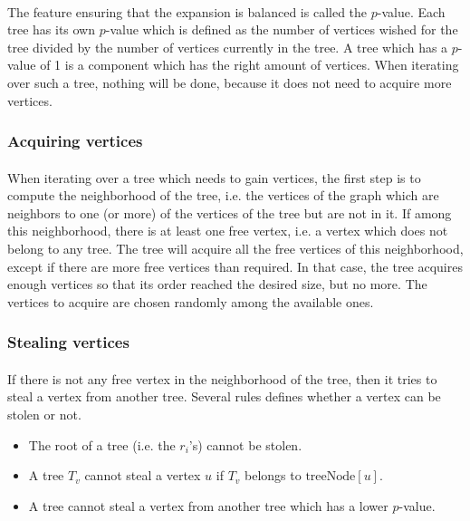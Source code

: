 \paragraph{}
The feature ensuring that the expansion is balanced is called the $p$-value.
Each tree has its own $p$-value which is defined as the number of vertices
wished for the tree divided by the number of vertices currently in the tree. A
tree which has a $p$-value of 1 is a component which has the right amount
of vertices. When iterating over such a tree, nothing will be done,
because it does not need to acquire more vertices.

\subsubsection{Acquiring vertices}
\paragraph{}
When iterating over a tree which needs to gain vertices, the first step
is to compute the neighborhood of the tree, i.e. the vertices of the
graph which are neighbors to one (or more) of the vertices of the tree
but are not in it. If among this neighborhood, there is at least one
free vertex, i.e. a vertex which does not belong to any tree. The
tree will acquire all the free vertices of this neighborhood, except if
there are more free vertices than required. In that case, the tree
acquires enough vertices so that its order reached the desired size, but no
more. The vertices to acquire are chosen randomly among the available ones.

\subsubsection{Stealing vertices}
\paragraph{}
If there is not any free vertex in the neighborhood of the tree, then it tries
to steal a vertex from another tree. Several rules defines whether a vertex can
be stolen or not.

\begin{itemize}
\item The root of a tree (i.e. the $r_i$'s) cannot be stolen.
\item A tree $T_v$ cannot steal a vertex $u$ if $T_v$ belongs to
  $\mathrm{treeNode}[u]$.
\item A tree cannot steal a vertex from another tree which has a
  lower $p$-value.
\end{itemize}

